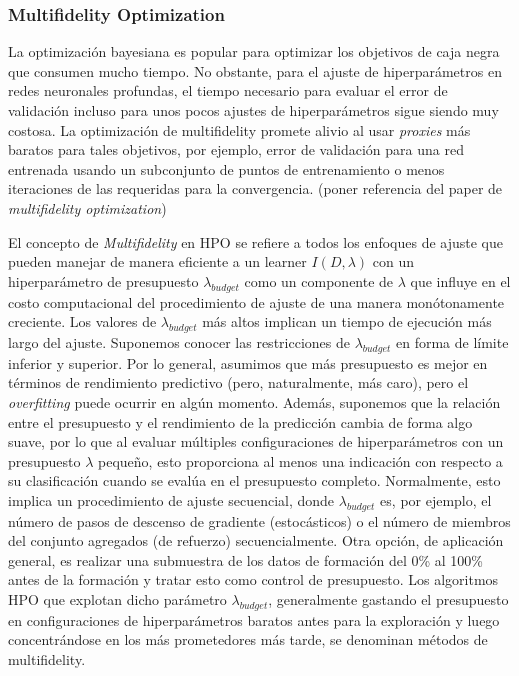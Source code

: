 \subsubsection{Multifidelity Optimization}



La optimización bayesiana es popular para optimizar los objetivos de caja negra que consumen mucho tiempo. No obstante, para el ajuste de hiperparámetros en redes neuronales profundas, el tiempo necesario para evaluar el error de validación incluso para unos pocos ajustes de hiperparámetros sigue siendo muy costosa. La optimización de multifidelity promete alivio al usar \emph{proxies} más baratos para tales objetivos, por ejemplo, error de validación para una red entrenada usando un subconjunto de puntos de entrenamiento o menos iteraciones de las requeridas para la convergencia. (poner referencia del paper de \textit{multifidelity optimization})

El concepto de \textit{Multifidelity} en HPO se refiere a todos los enfoques de ajuste que pueden manejar de manera eficiente a un learner $I(D, \lambda)$ con un hiperparámetro de presupuesto $\lambda_{budget}$ como un componente de $\lambda$ que influye en el costo computacional del procedimiento de ajuste de una manera monótonamente creciente. Los valores de $\lambda_{budget}$ más altos implican un tiempo de ejecución más largo del ajuste. Suponemos conocer las restricciones de $\lambda_{budget}$ en forma de límite inferior y superior. Por lo general, asumimos que más presupuesto es mejor en términos de rendimiento predictivo (pero, naturalmente, más caro), pero el \textit{overfitting} puede ocurrir en algún momento. Además, suponemos que la relación entre el presupuesto y el rendimiento de la predicción cambia de forma algo suave, por lo que al evaluar múltiples configuraciones de hiperparámetros con un presupuesto $\lambda$ pequeño, esto proporciona al menos una indicación con respecto a su clasificación cuando se evalúa en el presupuesto completo. Normalmente, esto implica un procedimiento de ajuste secuencial, donde $\lambda_{budget}$ es, por ejemplo,  el número de pasos de descenso de gradiente (estocásticos) o el número de miembros del conjunto agregados (de refuerzo) secuencialmente. Otra opción, de aplicación general, es realizar una submuestra de los datos de formación del 0\% al 100\% antes de la formación y tratar esto como control de presupuesto. Los algoritmos HPO que explotan dicho parámetro $\lambda_{budget}$, generalmente gastando el presupuesto en configuraciones de hiperparámetros baratos antes para la exploración y luego concentrándose en los más prometedores más tarde, se denominan métodos de multifidelity.

